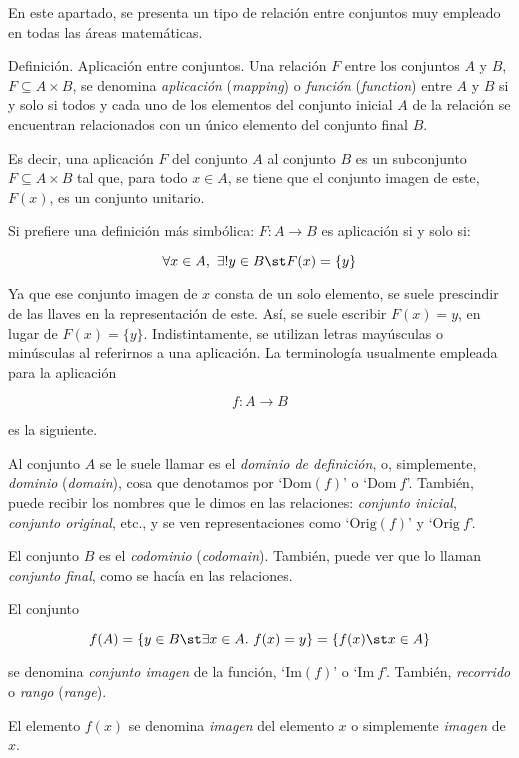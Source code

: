 


En este apartado, se presenta un tipo de relación entre conjuntos muy
empleado en todas las áreas matemáticas.

Definición. Aplicación entre conjuntos. Una relación $F$ entre los conjuntos
$A$ y $B$, $F \subseteq A \times B$, se denomina \emph{aplicación}
(\emph{mapping}) o \emph{función} (\emph{function}) entre $A$ y $B$ si y
solo si todos y cada uno de los elementos del conjunto inicial $A$ de la
relación se encuentran relacionados con un único elemento del conjunto final
$B$.

Es decir, una aplicación $F$ del conjunto $A$ al conjunto $B$ es un
subconjunto $F \subseteq A \times B$ tal que, para todo $x \in A$, se tiene
que el conjunto imagen de este, $F(x)$, es un conjunto unitario.

Si prefiere una definición más simbólica: $F: A \longrightarrow B$ es
aplicación si y solo si:

$$ \forall x \in A,\ \exists! y \in B \st F(x) = \{y\} $$

Ya que ese conjunto imagen de $x$ consta de un solo elemento, se suele
prescindir de las llaves en la representación de este. Así, se suele
escribir $F(x) = y$, en lugar de $F(x) = \{y\}$. Indistintamente, se
utilizan letras mayúsculas o minúsculas al referirnos a una aplicación. La
terminología usualmente empleada para la aplicación

$$ f: A \longrightarrow B $$

\noindent es la siguiente.

Al conjunto $A$ se le suele llamar es el \emph{dominio de definición}, o,
simplemente, \emph{dominio} (\emph{domain}), cosa que denotamos por
`$\text{Dom}(f)$' o `$\text{Dom}\ f$'. También, puede recibir los nombres
que le dimos en las relaciones: \emph{conjunto inicial}, \emph{conjunto
original}, etc., y se ven representaciones como `$\text{Orig}(f)$' y
`$\text{Orig}\ f$'.

El conjunto $B$ es el \emph{codominio} (\emph{codomain}). También, puede ver
que lo llaman \emph{conjunto final}, como se hacía en las relaciones.

El conjunto

$$ f(A) = \{y \in B \st \exists x \in A.\ f(x) = y\} = \{f(x) \st x \in A\}
$$

\noindent se denomina \emph{conjunto imagen} de la función, `$\text{Im}(f)$'
o `$\text{Im}\ f$'. También, \emph{recorrido} o \emph{rango} (\emph{range}).

El elemento $f(x)$ se denomina \emph{imagen} del elemento $x$ o simplemente
\emph{imagen} de $x$.

